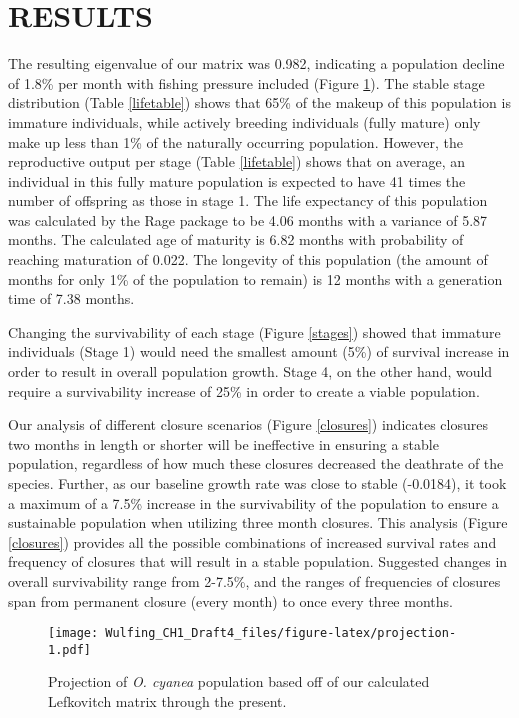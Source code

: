 \documentclass[
]{article}
\begin{document}
\hypertarget{results}{%
\section{RESULTS}\label{results}}

The resulting eigenvalue of our matrix was 0.982, indicating a population decline of 1.8\% per month with fishing pressure included (Figure \ref{projection}). The stable stage distribution (Table \ref{lifetable}) shows that 65\% of the makeup of this population is immature individuals, while actively breeding individuals (fully mature) only make up less than 1\% of the naturally occurring population. However, the reproductive output per stage (Table \ref{lifetable}) shows that on average, an individual in this fully mature population is expected to have 41 times the number of offspring as those in stage 1. The life expectancy of this population was calculated by the Rage package to be 4.06 months with a variance of 5.87 months. The calculated age of maturity is 6.82 months with probability of reaching maturation of 0.022. The longevity of this population (the amount of months for only 1\% of the population to remain) is 12 months with a generation time of 7.38 months.

Changing the survivability of each stage (Figure \ref{stages}) showed that immature individuals (Stage 1) would need the smallest amount (5\%) of survival increase in order to result in overall population growth. Stage 4, on the other hand, would require a survivability increase of 25\% in order to create a viable population.

Our analysis of different closure scenarios (Figure \ref{closures}) indicates closures two months in length or shorter will be ineffective in ensuring a stable population, regardless of how much these closures decreased the deathrate of the species. Further, as our baseline growth rate was close to stable (-0.0184), it took a maximum of a 7.5\% increase in the survivability of the population to ensure a sustainable population when utilizing three month closures. This analysis (Figure \ref{closures}) provides all the possible combinations of increased survival rates and frequency of closures that will result in a stable population. Suggested changes in overall survivability range from 2-7.5\%, and the ranges of frequencies of closures span from permanent closure (every month) to once every three months.



\begin{figure}
\centering
\texttt{[image: Wulfing\_CH1\_Draft4\_files/figure-latex/projection-1.pdf]}
\caption{\label{fig:projection}Projection of \emph{O. cyanea} population based off of our calculated Lefkovitch matrix through the present. \label{projection}}
\end{figure}
\end{document}
